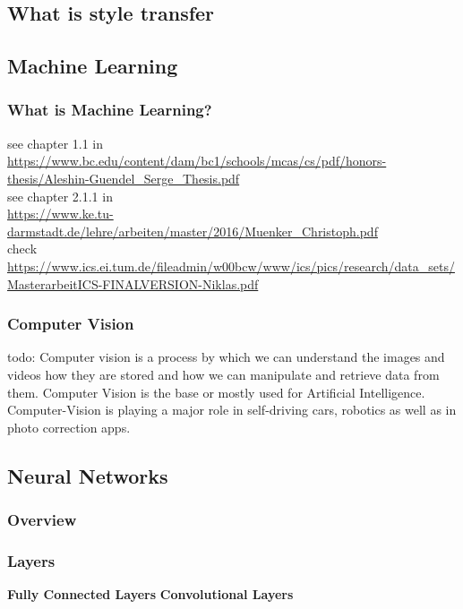 \documentclass[../Main.tex]{subfiles}
\begin{document}
\subsection{What is style transfer}

\subsection{Machine Learning} 
    \subsubsection{What is Machine Learning?}
    see chapter 1.1 in \\
    \url{https://www.bc.edu/content/dam/bc1/schools/mcas/cs/pdf/honors-thesis/Aleshin-Guendel_Serge_Thesis.pdf} \\
    see chapter 2.1.1 in \\
    \url{https://www.ke.tu-darmstadt.de/lehre/arbeiten/master/2016/Muenker_Christoph.pdf} \\
    check \\
    \url{https://www.ics.ei.tum.de/fileadmin/w00bcw/www/ics/pics/research/data_sets/MasterarbeitICS-FINALVERSION-Niklas.pdf}\\

    \subsubsection{Computer Vision}
    todo:
    Computer vision is a process by which we can understand the images and videos how they are stored and how we can manipulate and retrieve data from them. Computer Vision is the base or mostly used for Artificial Intelligence. Computer-Vision is playing a major role in self-driving cars, robotics as well as in photo correction apps.
    

\subsection{Neural Networks}
    \subsubsection{Overview}
    \subsubsection{Layers}
        \textbf{Fully Connected Layers}
        \textbf{Convolutional Layers}
\end{document}
